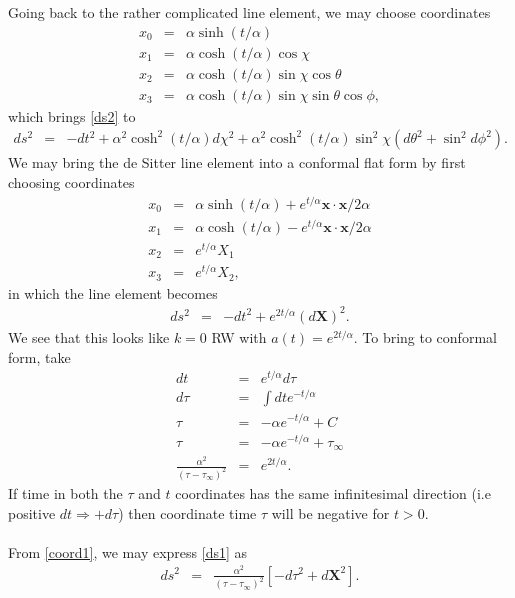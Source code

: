 \documentclass[10pt,letterpaper]{article}
\begin{document}
Going back to the rather complicated line element, we may choose coordinates
\begin{eqnarray}
x_0 &=& \alpha \sinh(t/\alpha)
\nonumber\\
x_1 &=& \alpha\cosh(t/\alpha)\cos\chi
\nonumber\\
x_2 &=& \alpha\cosh(t/\alpha)\sin\chi\cos\theta
\nonumber\\
x_3&=& \alpha\cosh(t/\alpha)\sin\chi\sin\theta\cos\phi,
\end{eqnarray}
which brings \eqref{ds2} to
\begin{eqnarray}
ds^2 &=& -dt^2 + \alpha^2 \cosh^2(t/\alpha) d\chi^2 + \alpha^2 \cosh^2(t/\alpha)\sin^2\chi (d\theta^2 + \sin^2d\phi^2).
\end{eqnarray}
We may bring the de Sitter line element into a conformal flat form by first choosing coordinates
\begin{eqnarray}
x_0 &=& \alpha\sinh(t/\alpha)+ e^{t/\alpha}\mathbf x\cdot\mathbf x/2\alpha
\nonumber\\
x_1 &=& \alpha\cosh(t/\alpha)- e^{t/\alpha}\mathbf x\cdot\mathbf x/2\alpha
\nonumber\\
x_2 &=& e^{t/\alpha}X_1
\nonumber\\
x_3&=& e^{t/\alpha}X_2,
\end{eqnarray}
in which the line element becomes
\begin{eqnarray}
ds^2 &=& -dt^2 + e^{2t/\alpha} (d\mathbf X)^2.
\label{ds1}
\end{eqnarray}
We see that this looks like $k=0$ RW with $a(t) = e^{2t/\alpha}$. To bring to conformal form, take
\begin{eqnarray}
dt &=& e^{t/\alpha}d\tau
\nonumber\\
d\tau &=& \int dt e^{-t/\alpha}
\nonumber\\
\tau&=& -\alpha e^{-t/\alpha} + C
\nonumber\\
\tau &=& -\alpha e^{-t/\alpha} + \tau_{\infty}
\nonumber\\
\frac{\alpha^2}{(\tau-\tau_{\infty})^2} &=& e^{2t/\alpha}.
\label{coord1}
\end{eqnarray}
If time in both the $\tau$ and $t$ coordinates has the same infinitesimal direction (i.e positive $dt \Rightarrow +d\tau$) then coordinate time $\tau$ will be negative for $t>0$. 
\\ \\
From \eqref{coord1}, we may express \eqref{ds1} as 
\begin{eqnarray}
ds^2 &=& \frac{\alpha^2}{(\tau-\tau_{\infty})^2} \left[ -d\tau^2 + d\mathbf X^2 \right].
\end{eqnarray}
\end{document}
